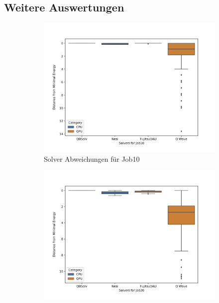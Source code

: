 \subsection*{Weitere Auswertungen}
 \begin{figure}[H]
        \centering
        \begin{subfigure}[b]{0.495\textwidth}
            \centering
            \includegraphics[width=\textwidth]{images/SolversJob10.png}
            \caption[]%
            {{\small Solver Abweichungen für Job10}}    
            \label{fig:DeviationJob10}
        \end{subfigure}
        \hfill
        \begin{subfigure}[b]{0.495\textwidth}  
            \centering 
            \includegraphics[width=\textwidth]{images/SolversJob20.png}

\end{subfigure}
\end{figure}
